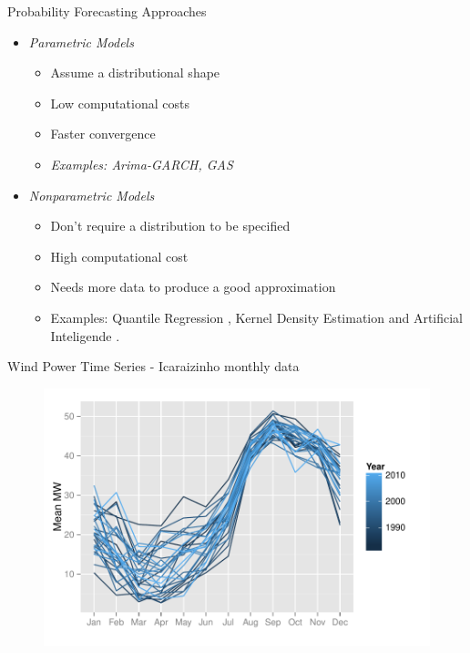 \documentclass[11pt]{beamer}
\begin{document}
\begin{frame}{Probability Forecasting Approaches}

\begin{itemize}

\item
\emph{Parametric Models}

\begin{itemize}
	
	\item
	Assume a distributional shape
	\item
	Low computational costs
	\item
	Faster convergence
	\item
	\emph{Examples: Arima-GARCH, GAS}
\end{itemize}
\item
\emph{Nonparametric Models}

\begin{itemize}
	
	\item
	Don't require a distribution to be specified
	\item
	High computational cost
	\item
	Needs more data to produce a good approximation

	\item Examples: Quantile Regression \cite{koenker1978regression}, Kernel Density Estimation \cite{gallego2016line} and Artificial Inteligende \cite{Wan2017}.
\end{itemize}
\end{itemize}

\end{frame}

\begin{frame}{Wind Power Time Series - Icaraizinho monthly data}

\begin{figure}
\centering
\includegraphics[width=0.9\linewidth]{Images/icaraizinho-mensal}
\end{figure}

\end{frame}
\end{document}
